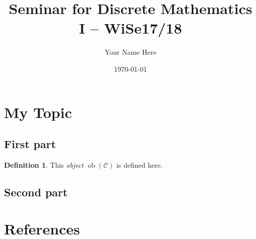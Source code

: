 \documentclass[a4paper]{article}
\title{Seminar for Discrete Mathematics I -- WiSe17/18}
\author{Your Name Here}
\date{\today} %
\theoremstyle{plain}
\theoremstyle{definition}
\newtheorem{definition}[theorem]{Definition}
\newcommand{\darkblue}{\color{darkblue}} %
\newcommand{\defn}[1]{\emph{\darkblue #1}} %
\DeclareMathOperator{\ob}{ob}
\def\C{\mathcal{C}}
\begin{document}
\maketitle

\section{My Topic}

\subsection{First part}

\begin{definition}
This \defn{object} $\ob(\C)$ is defined here.
\end{definition}

\subsection{Second part}

\section*{References}
\end{document}
